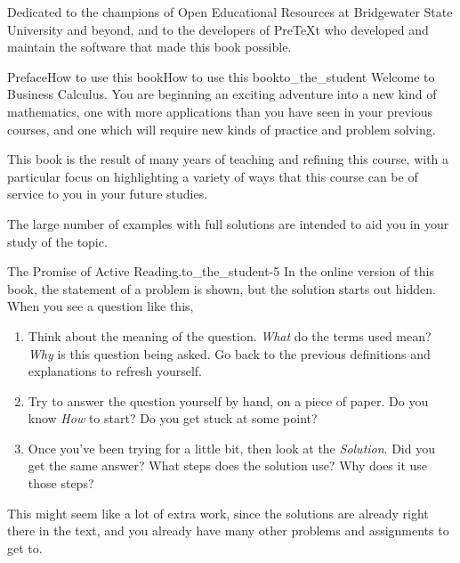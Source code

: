 \documentclass[oneside,10pt,]{tufte-book}
\numberwithin{equation}{chapter}
\begin{document}
\thispagestyle{empty}
\begin{center}\Large%
Dedicated to the champions of Open Educational Resources at Bridgewater State University and beyond, and to the developers of PreTeXt who developed and maintain the software that made this book possible.%
\end{center}
\clearpage
%
%
\typeout{************************************************}
\typeout{************************************************}
%
\begin{preface}{Preface}{How to use this book}{}{How to use this book}{}{}{to_the_student}
Welcome to Business Calculus. You are beginning an exciting adventure into a new kind of mathematics, one with more applications than you have seen in your previous courses, and one which will require new kinds of practice and problem solving.%
\par
This book is the result of many years of teaching and refining this course, with a particular focus on highlighting a variety of ways that this course can be of service to you in your future studies.%
\par
The large number of examples with full solutions are intended to aid you in your study of the topic.%
\begin{paragraphs}{The Promise of Active Reading.}{to_the_student-5}%
In the online version of this book, the statement of a problem is shown, but the solution starts out hidden. When you see a question like this,%
\begin{enumerate}
\item{}Think about the meaning of the question.  \emph{What} do the terms used mean?  \emph{Why} is this question being asked.  Go back to the previous definitions and explanations to refresh yourself.%
\item{}Try to answer the question yourself by hand, on a piece of paper.  Do you know \emph{How} to start?  Do you get stuck at some point?%
\item{}Once you've been trying for a little bit, then look at the \emph{Solution}.  Did you get the same answer?  What steps does the solution use?  Why does it use those steps?%
\end{enumerate}
%
\par
This might seem like a lot of extra work, since the solutions are already right there in the text, and you already have many other problems and assignments to get to.%

\end{paragraphs}
\end{preface}
\end{document}
